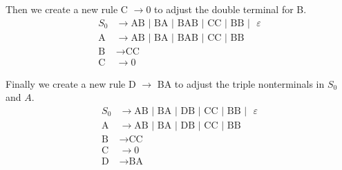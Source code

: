 \documentclass{article}
\begin{document}
Then we create a new rule C $\rightarrow 0$ to adjust the double terminal for B.
  \begin{align*}
   S_0 &\rightarrow \text{AB }|\text{ BA }|\text{ BAB }|\text{ CC }|\text{ BB }|\text{ }\varepsilon\\
   \text{A} &\rightarrow \text{AB }|\text{ BA }|\text{ BAB }|\text{ CC }|\text{ BB }\\
   \text{B} &\rightarrow \text{CC}\\
   \text{C} &\rightarrow 0
  \end{align*}

Finally we create a new rule D $\rightarrow$ BA to adjust the triple nonterminals in $S_0$ and $A$.
  \begin{align*}
   S_0 &\rightarrow \text{AB }|\text{ BA }|\text{ DB }|\text{ CC }|\text{ BB }|\text{ }\varepsilon\\
   \text{A} &\rightarrow \text{AB }|\text{ BA }|\text{ DB }|\text{ CC }|\text{ BB }\\
   \text{B} &\rightarrow \text{CC}\\
   \text{C} &\rightarrow 0\\
   \text{D} &\rightarrow \text{BA}
  \end{align*}
\end{document}
